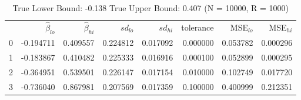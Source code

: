 \begin{table}
\caption{True Lower Bound: -0.138 True Upper Bound: 0.407 (N = 10000, R = 1000)}
\begin{tabular}{lrrrrrrr}
 & $\hat{\beta}_{lo}$ & $\hat{\beta}_{hi}$ & $sd_{lo}$ & $sd_{hi}$ & tolerance & MSE$_{lo}$ & MSE$_{hi}$ \\
0 & -0.194711 & 0.409557 & 0.224812 & 0.017092 & 0.000000 & 0.053782 & 0.000296 \\
1 & -0.183867 & 0.410482 & 0.225333 & 0.016916 & 0.000100 & 0.052899 & 0.000295 \\
2 & -0.364951 & 0.539501 & 0.226147 & 0.017154 & 0.010000 & 0.102749 & 0.017720 \\
3 & -0.736040 & 0.867981 & 0.207569 & 0.017359 & 0.100000 & 0.400999 & 0.212351 \\
\end{tabular}
\end{table}
